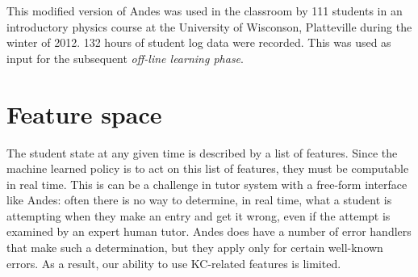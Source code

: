 \documentclass{edm_template}
\begin{document}
This modified version of Andes was used in the classroom by 111 students
in an introductory physics course at the University of Wisconson, Platteville during the
winter of 2012.   132 hours of student log data were recorded.  This
was used as input for the subsequent {\em off-line learning phase}.

\section{Feature space}

The student state at any given time is described by a list of
features.   Since the machine learned policy is to act on this list of
features, they must be computable in real time.  This is can be a
challenge in tutor system with a free-form interface like  Andes:
often there is no way to determine, in real time, what a student is
attempting when they make an entry and get it wrong, even if the attempt
is examined by an expert human tutor.  Andes does have a
number of error handlers that make such a determination, but they 
apply only for certain well-known errors.  As a result, our ability to use
KC-related features is limited.
\end{document}
